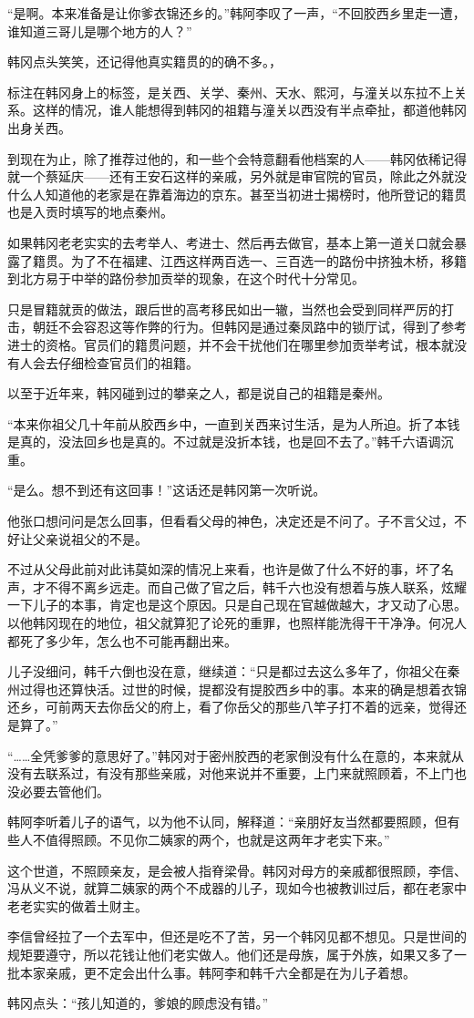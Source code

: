 “是啊。本来准备是让你爹衣锦还乡的。”韩阿李叹了一声，“不回胶西乡里走一遭，谁知道三哥儿是哪个地方的人？”

韩冈点头笑笑，还记得他真实籍贯的的确不多。，

标注在韩冈身上的标签，是关西、关学、秦州、天水、熙河，与潼关以东拉不上关系。这样的情况，谁人能想得到韩冈的祖籍与潼关以西没有半点牵扯，都道他韩冈出身关西。

到现在为止，除了推荐过他的，和一些个会特意翻看他档案的人——韩冈依稀记得就一个蔡延庆——还有王安石这样的亲戚，另外就是审官院的官员，除此之外就没什么人知道他的老家是在靠着海边的京东。甚至当初进士揭榜时，他所登记的籍贯也是入贡时填写的地点秦州。

如果韩冈老老实实的去考举人、考进士、然后再去做官，基本上第一道关口就会暴露了籍贯。为了不在福建、江西这样两百选一、三百选一的路份中挤独木桥，移籍到北方易于中举的路份参加贡举的现象，在这个时代十分常见。

只是冒籍就贡的做法，跟后世的高考移民如出一辙，当然也会受到同样严厉的打击，朝廷不会容忍这等作弊的行为。但韩冈是通过秦凤路中的锁厅试，得到了参考进士的资格。官员们的籍贯问题，并不会干扰他们在哪里参加贡举考试，根本就没有人会去仔细检查官员们的祖籍。

以至于近年来，韩冈碰到过的攀亲之人，都是说自己的祖籍是秦州。

“本来你祖父几十年前从胶西乡中，一直到关西来讨生活，是为人所迫。折了本钱是真的，没法回乡也是真的。不过就是没折本钱，也是回不去了。”韩千六语调沉重。

“是么。想不到还有这回事！”这话还是韩冈第一次听说。

他张口想问问是怎么回事，但看看父母的神色，决定还是不问了。子不言父过，不好让父亲说祖父的不是。

不过从父母此前对此讳莫如深的情况上来看，也许是做了什么不好的事，坏了名声，才不得不离乡远走。而自己做了官之后，韩千六也没有想着与族人联系，炫耀一下儿子的本事，肯定也是这个原因。只是自己现在官越做越大，才又动了心思。以他韩冈现在的地位，祖父就算犯了论死的重罪，也照样能洗得干干净净。何况人都死了多少年，怎么也不可能再翻出来。

儿子没细问，韩千六倒也没在意，继续道：“只是都过去这么多年了，你祖父在秦州过得也还算快活。过世的时候，提都没有提胶西乡中的事。本来的确是想着衣锦还乡，可前两天去你岳父的府上，看了你岳父的那些八竿子打不着的远亲，觉得还是算了。”

“……全凭爹爹的意思好了。”韩冈对于密州胶西的老家倒没有什么在意的，本来就从没有去联系过，有没有那些亲戚，对他来说并不重要，上门来就照顾着，不上门也没必要去管他们。

韩阿李听着儿子的语气，以为他不认同，解释道：“亲朋好友当然都要照顾，但有些人不值得照顾。不见你二姨家的两个，也就是这两年才老实下来。”

这个世道，不照顾亲友，是会被人指脊梁骨。韩冈对母方的亲戚都很照顾，李信、冯从义不说，就算二姨家的两个不成器的儿子，现如今也被教训过后，都在老家中老老实实的做着土财主。

李信曾经拉了一个去军中，但还是吃不了苦，另一个韩冈见都不想见。只是世间的规矩要遵守，所以花钱让他们老实做人。他们还是母族，属于外族，如果又多了一批本家亲戚，更不定会出什么事。韩阿李和韩千六全都是在为儿子着想。

韩冈点头：“孩儿知道的，爹娘的顾虑没有错。”

